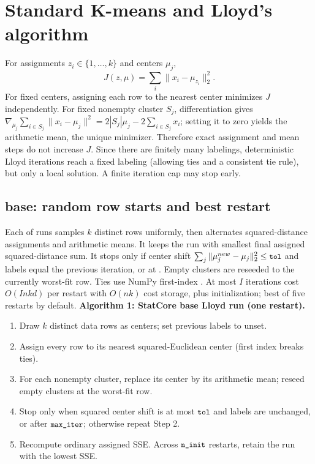 \documentclass[conference]{IEEEtran}
\begin{document}
\section{Standard K-means and Lloyd's algorithm}
For assignments \(z_i\in\{1,\ldots,k\}\) and centers \(\mu_j\),
\begin{equation}\label{eq:sse}J(z,\mu)=\sum_i\|x_i-\mu_{z_i}\|_2^2.\end{equation}
For fixed centers, assigning each row to the nearest center minimizes \(J\) independently. For fixed nonempty cluster \(S_j\), differentiation gives \(\nabla_{\mu_j}\sum_{i\in S_j}\|x_i-\mu_j\|^2=2|S_j|\mu_j-2\sum_{i\in S_j}x_i\); setting it to zero yields the arithmetic mean, the unique minimizer. Therefore exact assignment and mean steps do not increase \(J\). Since there are finitely many labelings, deterministic Lloyd iterations reach a fixed labeling (allowing ties and a consistent tie rule), but only a local solution. A finite iteration cap may stop early.
\subsection{base: random row starts and best restart}
Each of  runs samples \(k\) distinct rows uniformly, then alternates squared-distance assignments and arithmetic means. It keeps the run with smallest final assigned squared-distance sum. It stops only if center shift \(\sum_j\|\mu_j^{new}-\mu_j\|_2^2\leq\texttt{\small tol}\) and labels equal the previous iteration, or at . Empty clusters are reseeded to the currently worst-fit row. Ties use NumPy first-index . At most \(I\) iterations cost \(O(Inkd)\) per restart with \(O(nk)\) cost storage, plus initialization; best of five restarts by default.
\noindent\textbf{Algorithm 1: StatCore base Lloyd run (one restart).}
\begin{enumerate}
\item Draw $k$ distinct data rows as centers; set previous labels to unset.
\item Assign every row to its nearest squared-Euclidean center (first index breaks ties).
\item For each nonempty cluster, replace its center by its arithmetic mean; reseed empty clusters at the worst-fit row.
\item Stop only when squared center shift is at most $\texttt{\small tol}$ and labels are unchanged, or after $\texttt{\small max\_iter}$; otherwise repeat Step 2.
\item Recompute ordinary assigned SSE. Across $\texttt{\small n\_init}$ restarts, retain the run with the lowest SSE.
\end{enumerate}
\end{document}
